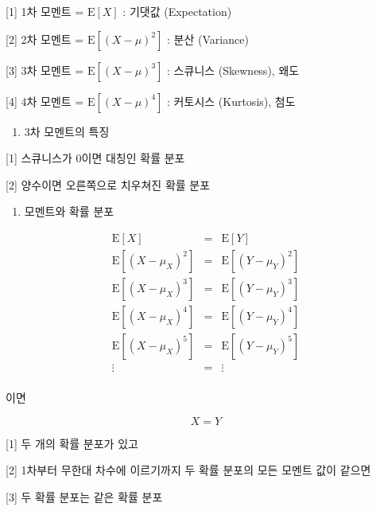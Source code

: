 \documentclass[11pt]{article}
\providecommand{\tightlist}{%
      \setlength{\itemsep}{0pt}\setlength{\parskip}{0pt}}
\begin{document}
    {[}1{]} 1차 모멘트 = \(\text{E}[X]\) : 기댓값 (Expectation)

{[}2{]} 2차 모멘트 = \(\text{E}[(X-\mu)^2]\) : 분산 (Variance)

{[}3{]} 3차 모멘트 = \(\text{E}[(X-\mu)^3]\) : 스큐니스 (Skewness), 왜도

{[}4{]} 4차 모멘트 = \(\text{E}[(X-\mu)^4]\) : 커토시스 (Kurtosis), 첨도

    \begin{enumerate}
\def\labelenumi{\arabic{enumi})}
\setcounter{enumi}{2}
\tightlist
\item
  3차 모멘트의 특징
\end{enumerate}

    {[}1{]} 스큐니스가 0이면 대칭인 확률 분포

{[}2{]} 양수이면 오른쪽으로 치우쳐진 확률 분포

    \begin{enumerate}
\def\labelenumi{\arabic{enumi})}
\setcounter{enumi}{2}
\tightlist
\item
  모멘트와 확률 분포
\end{enumerate}

    \[
\begin{eqnarray}
\text{E}[X] &=& \text{E}[Y] \\
\text{E}[(X-\mu_X)^2] &=& \text{E}[(Y-\mu_Y)^2] \\
\text{E}[(X-\mu_X)^3] &=& \text{E}[(Y-\mu_Y)^3] \\
\text{E}[(X-\mu_X)^4] &=& \text{E}[(Y-\mu_Y)^4] \\
\text{E}[(X-\mu_X)^5] &=& \text{E}[(Y-\mu_Y)^5] \\
\vdots &=& \vdots \\
\end{eqnarray}
\]

이면

\[ X = Y \]

    {[}1{]} 두 개의 확률 분포가 있고

{[}2{]} 1차부터 무한대 차수에 이르기까지 두 확률 분포의 모든 모멘트 값이
같으면

{[}3{]} 두 확률 분포는 같은 확률 분포


    
    
    
    
\end{document}
